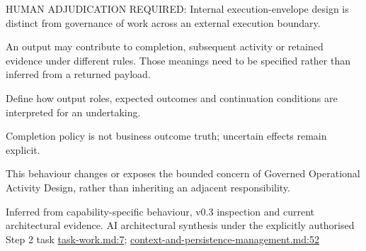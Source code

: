 HUMAN ADJUDICATION REQUIRED: Internal execution-envelope design is distinct from governance of work across an external execution boundary.



An output may contribute to completion, subsequent activity or retained evidence under different rules. Those meanings need to be specified rather than inferred from a returned payload.



Define how output roles, expected outcomes and continuation conditions are interpreted for an undertaking.



Completion policy is not business outcome truth; uncertain effects remain explicit.



This behaviour changes or exposes the bounded concern of Governed Operational Activity Design, rather than inheriting an adjacent responsibility.


Inferred from capability-specific behaviour, v0.3 inspection and current architectural evidence. AI architectural synthesis under the explicitly authorised Step 2 task \hyperref[evidence:7f4ed7644a978ab2]{task-work.md:7}; \hyperref[evidence:ea0c62dfd5edfd4a]{context-and-persistence-management.md:52}
